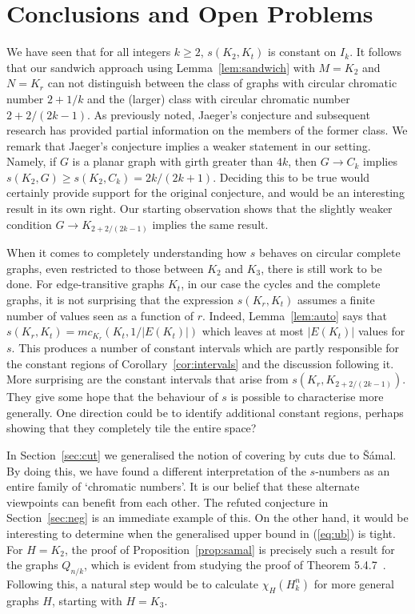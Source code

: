 \documentclass[11pt,a4paper]{article}
\begin{document}
\section{Conclusions and Open Problems}
\label{sec:open}

We have seen that for all integers $k \geq 2$, $s(K_2,K_t)$ is constant on $I_k$.
It follows that our sandwich approach using Lemma~\ref{lem:sandwich} with $M = K_2$
and $N = K_r$ can not distinguish between the class
of graphs with circular chromatic number $2+1/k$ and the (larger) class with
circular chromatic number $2+2/(2k-1)$.
As previously noted, Jaeger's conjecture and subsequent research
has provided partial information on the members of the former class.
We remark that Jaeger's conjecture implies a weaker statement in our
setting. Namely, if $G$ is a planar graph with girth greater than $4k$,
then $G \rightarrow C_k$ implies $s(K_2, G) \geq s(K_2,C_k) =
2k/(2k+1)$. Deciding this to be true would certainly provide support for
the original conjecture, and would be an interesting result in its
own right.
Our starting observation shows that the slightly weaker condition
$G \rightarrow K_{2+2/(2k-1)}$ implies the same result.

When it comes to completely understanding how $s$ behaves on circular complete graphs, even
restricted to those between $K_2$ and $K_3$, there is still work to be done.
For edge-transitive graphs $K_t$, in our case the cycles and the complete graphs, 
it is not surprising
that the expression $s(K_r, K_t)$ assumes a finite number of values seen as a function of $r$.
Indeed, Lemma~\ref{lem:auto} says that $s(K_r, K_t) = mc_{K_r}(K_t, 1/|E(K_t)|)$ which
leaves at most $|E(K_t)|$ values for $s$.
This produces a number of constant intervals which are partly 
responsible for the constant regions of Corollary~\ref{cor:intervals} and the discussion
following it.
More surprising are the constant intervals that arise from
$s(K_r,K_{2+2/(2k-1)})$.
They give some hope that the behaviour of $s$ is possible to characterise more generally.
One direction could be to identify additional constant regions,
perhaps showing that they completely tile the entire space?




In Section~\ref{sec:cut} we generalised the notion of covering by cuts
due to \v{S}\'{a}mal.
By doing this, we have found a different interpretation of the $s$-numbers
as an entire family of `chromatic numbers'.
It is our belief that these alternate viewpoints can benefit from each other.
The refuted conjecture in Section~\ref{sec:neg} is an immediate example of
this.
On the other hand, it would be interesting to determine
when the generalised upper bound in (\ref{eq:ub}) is tight.
For $H = K_2$, the proof of Proposition~\ref{prop:samal} is precisely such a result
for the graphs $Q_{n/k}$,
which is evident from studying the proof of Theorem 5.4.7~\cite{samal:06}.
Following this, a natural step would be to calculate $\chi_H(H_k^n)$ for
more general graphs $H$, starting with $H = K_3$.
\end{document}
